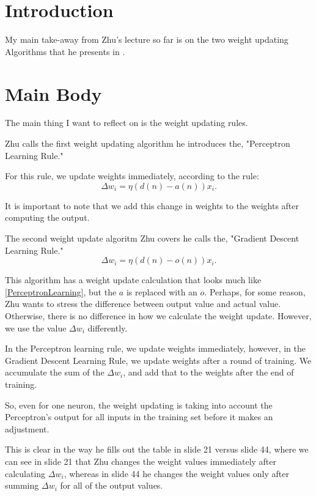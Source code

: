 \section{Introduction}
My main take-away from Zhu's lecture so far is on the two weight updating
Algorithms that he presents in \cite{zhuPerceptron}.
\section{Main Body}
The main thing I want to reflect on is the weight updating rules.

Zhu calls the first weight updating algorithm he introduces the, "Perceptron 
Learning Rule." 

For this rule, we update weights immediately, according to the rule:
\begin{equation}
\label{PerceptronLearning}
\Delta w_i = \eta \left(d\left(n\right) - a\left(n\right)\right)x_i.
\end{equation}

It is important to note that we add this change in weights to the weights after
computing the output.

The second weight update algoritm Zhu covers he calls the, "Gradient Descent
Learning Rule."
\begin{equation}
\label{GradDescent}
\Delta w_i = \eta \left(d\left(n\right) - o\left(n\right)\right)x_i.
\end{equation}

This algorithm has a weight update calculation that looks much like 
\ref{PerceptronLearning}, but the $a$ is replaced with an $o$.  Perhaps, for
some reason, Zhu wants to stress the difference between output value and
actual value.  Otherwise, there is no difference in how we calculate the weight
update.  However, we use the value $\Delta w_i$ differently.

In the Perceptron learning rule, we update weights immediately, however, in
the Gradient Descent Learning Rule, we update weights after a round of training.
We accumulate the sum of the $\Delta w_i$, and add that to the weights after
the end of training.

So, even for one neuron, the weight updating is taking into account the 
Perceptron's output for all inputs in the training set before it makes an
adjustment.

This is clear in the way he fills out the table in slide 21 versus slide 44,
where we can see in slide 21 that Zhu changes the weight values immediately
after calculating $\Delta w_i$, whereas in slide 44 he changes the weight
values only after summing $\Delta w_i$ for all of the output values.
